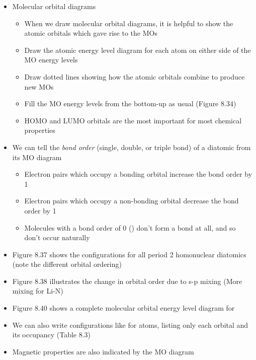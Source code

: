 \documentclass[12pt, openany, letterpaper]{memoir}
\begin{document}
\begin{itemize}
\begin{itemize}
      \item Because there are two pairs of $p$ orbitals that can combine this way, there are two degenerate $\pi_{2p}$ and two degenerate $\pi^*_{2p}$ orbitals
      \item The ordering of the $\pi_{2p}$ and $\sigma_{2p}$ orbitals is different for different elements (Figure 8.37)
    \end{itemize}
	\item Molecular orbital diagrams 
    \begin{itemize}
      \item When we draw molecular orbital diagrams, it is helpful to show the atomic orbitals which gave rise to the MOs
      \item Draw the atomic energy level diagram for each atom on either side of the MO energy levels
      \item Draw dotted lines showing how the atomic orbitals combine to produce new MOs
      \item Fill the MO energy levels from the bottom-up as usual (Figure 8.34)
      \item HOMO and LUMO orbitals are the most important for most chemical properties
    \end{itemize}
	\item We can tell the \emph{bond order} (single, double, or triple bond) of a diatomic from its MO diagram
    \begin{itemize}
      \item Electron pairs which occupy a bonding orbital increase the bond order by 1
      \item Electron pairs which occupy a non-bonding orbital decrease the bond order by 1
      \item Molecules with a bond order of 0 () don't form a bond at all, and so don't occur naturally
    \end{itemize}
	\item Figure 8.37 shows the configurations for all period 2 homonuclear diatomics (note the different orbital ordering)
  \item Figure 8.38 illustrates the change in orbital order due to s-p mixing (More mixing for Li-N)
  \item Figure 8.40 shows a complete molecular orbital energy level diagram for 
  \item We can also write configurations like for atoms, listing only each orbital and its occupancy (Table 8.3)
	\item Magnetic properties are also indicated by the MO diagram

\end{itemize}
\end{document}
